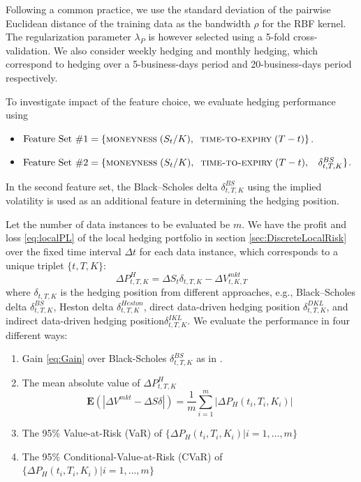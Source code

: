 \documentclass[letterpaper,12pt,titlepage,oneside,final]{book}
\numberwithin{equation}{section}
\theoremstyle{definition}
\newcommand{\E}{\mathbf{E}}
\newcommand{\DS}{\Delta S}
\newcommand{\DVmkt}{\Delta V^{mkt}}
\newcommand{\DT}{\Delta t}
\newcommand{\MeanAbs}{\E(|\DVmkt-\DS \delta |)}
\newcommand{\Smkt}{S}
\begin{document}
Following a common practice, we use the standard deviation of the pairwise Euclidean distance of the training data as the bandwidth $\rho$ for the RBF kernel. The regularization parameter $\lambda_P$  is however selected using a 5-fold cross-validation. We also consider weekly hedging and monthly hedging, which correspond to hedging over a 5-business-days period and 20-business-days period respectively.

To investigate impact of the feature choice,  we evaluate hedging performance using
\begin{itemize}
\item
$\text{Feature Set \#1} = \{\textsc{moneyness}\; (S_t/K),\;\;\textsc{time-to-expiry}\; (T-t)\}$.
\item
$\text{Feature Set \#2} = \{\textsc{moneyness} \;(S_t/K),\;\;\textsc{time-to-expiry} \;(T-t) ,\;\;~ \delta^{BS}_{t,T,K}\}$.
\end{itemize}
In the second feature set,  the Black–Scholes delta $\delta^{BS}_{t,T,K}$ using the implied volatility  is used as an additional feature in determining the hedging position. 

Let the number of data instances to be evaluated be $m$.
We have the profit and loss \eqref{eq:localPL} of the local hedging portfolio in section \ref{sec:DiscreteLocalRisk} over the fixed time interval $\DT$ for each data instance, which corresponds to a unique triplet $\{t,T,K\}$:
\[
	\Delta P^{H}_{t,T,K}=\Delta \Smkt_{t} \delta_{t,T,K} -\Delta V^{mkt}_{t,K,T}
\]
where $\delta_{t,T,K}$ is the hedging position from different approaches, e.g., Black–Scholes delta $\delta^{BS}_{t,T,K}$, Heston delta $\delta^{Heston}_{t,T,K}$, direct data-driven hedging position $\delta^{DKL}_{t,T,K}$, and  indirect data-driven hedging position$\delta^{IKL}_{t,T,K}$.
We evaluate the performance in four different ways:
\begin{enumerate}
	\item Gain \eqref{eq:Gain} over Black-Scholes $\delta^{BS}_{t,T,K}$ as in \cite{hulloptimal}.
	\item The mean absolute value of $\Delta P^{H}_{t,T,K}$
	\[
		\MeanAbs=\frac{1}{m}\sum_{i=1}^m |\Delta P_{H}(t_i,T_i,K_i)|
	\]

	\item The 95\% Value-at-Risk (VaR) of $\{\Delta P_{H}(t_i,T_i,K_i)| i=1,\dots, m\}$
	\item The 95\% Conditional-Value-at-Risk (CVaR) of $\{\Delta P_{H}(t_i,T_i,K_i)| i=1,\dots, m\}$
\end{enumerate}
\end{document}
